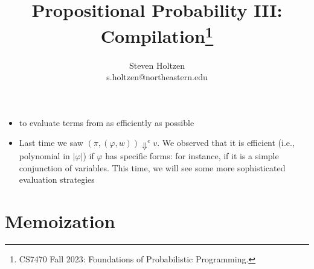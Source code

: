 \documentclass{tufte-handout}
\title{Propositional Probability III: Compilation\thanks{CS7470 Fall 2023: Foundations of Probabilistic Programming.}}
\author[]{Steven Holtzen\\s.holtzen@northeastern.edu}
\begin{document}
\maketitle%
\begin{itemize}
  \item {} to evaluate terms from \prop{} as efficiently as possible
  \item Last time we saw $(\pi, (\varphi, w)) \Downarrow^e v$. We observed that 
  it is efficient (i.e., polynomial in $|\varphi|$) if $\varphi$ has specific 
  forms: for instance, if it is a simple conjunction of variables. This time, we
  will see some more sophisticated evaluation strategies
\end{itemize}

\section{Memoization}
\end{document}
